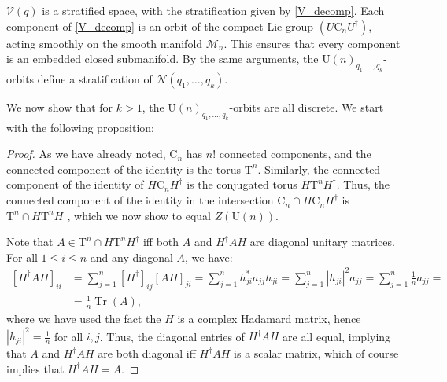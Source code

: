 \documentclass[referee,sn-mathphys-num]{sn-jnl}%
\theoremstyle{thmstyleone}%
\newtheorem{proposition}[theorem]{Proposition}%
\theoremstyle{thmstyletwo}%
\theoremstyle{remark}
\theoremstyle{thmstylethree}%
\DeclareMathOperator{\Tr}{Tr}
\newcommand{\abs}[1]{\left\vert#1\right\vert}
\begin{document}
$ \mathcal{V} \left( q \right) $ is a stratified space, with the stratification given by \eqref{V_decomp}.
Each component of \eqref{V_decomp} is an orbit of the compact Lie group $ \left( U \mathrm{C}_n U^\dagger \right) $, acting smoothly on the smooth manifold $ \mathcal{M}_n $. This ensures that every component is an embedded closed submanifold. By the same arguments, the $ \mathrm{U} \left( n \right)_{q_1, \ldots, q_k}$-orbits define a stratification of $ \mathcal{N} \left( q_1, \ldots, q_k \right) $.

We now show that for $k>1$, the $ \mathrm{U} \left( n \right)_{q_1, \ldots, q_k}$-orbits are all discrete.
We start with the following proposition:
\begin{proof}
	As we have already noted, $ \mathrm{C}_n $ has $n!$ connected components, and the connected component of the identity is the torus $ \mathrm{T}^n $. Similarly, the connected component of the identity of $ H \mathrm{C}_n H^\dagger $ is the conjugated torus $ H \mathrm{T}^n H^\dagger $. Thus, the connected component of the identity in the intersection $ \mathrm{C}_n \cap H \mathrm{C}_n H^\dagger $ is $ \mathrm{T}^n \cap H \mathrm{T}^n H^\dagger $, which we now show to equal $ Z \left( \mathrm{U} \left( n \right) \right) $.
	
	Note that $ A \in \mathrm{T}^n \cap H \mathrm{T}^n H^\dagger $ iff both $A$ and $ H^\dagger A H $ are diagonal unitary matrices.
	For all $ 1 \leq i \leq n $ and any diagonal $A$, we have:
	\begin{align}
		\left[ H^\dagger A H \right]_{ii} & = \sum_{j=1}^n \left[ H^\dagger \right]_{ij} \left[ AH \right]_{ji} = \sum_{j=1}^n h_{ji}^* a_{jj} h_{ji} = \sum_{j=1}^n \abs{h_{ji}}^2 a_{jj} = \sum_{j=1}^n \frac{1}{n} a_{jj} = \nonumber\\
		& = \frac{1}{n} \Tr \left( A \right) ,
	\end{align}
	where we have used the fact the $H$ is a complex Hadamard matrix, hence $ \abs{h_{ji}}^2 = \frac{1}{n} $ for all $i,j$. Thus, the diagonal entries of $H^\dagger A H$ are all equal, implying that $A$ and $H^\dagger A H$ are both diagonal iff $H^\dagger A H$ is a scalar matrix, which of course implies that $ H^\dagger A H = A $.
\end{proof}
\end{document}

